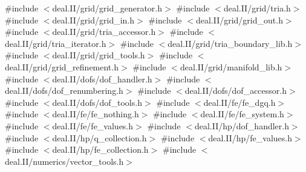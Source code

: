 {\ttfamily \#include $<$deal.\+I\+I/grid/grid\+\_\+generator.\+h$>$}\newline
{\ttfamily \#include $<$deal.\+I\+I/grid/tria.\+h$>$}\newline
{\ttfamily \#include $<$deal.\+I\+I/grid/grid\+\_\+in.\+h$>$}\newline
{\ttfamily \#include $<$deal.\+I\+I/grid/grid\+\_\+out.\+h$>$}\newline
{\ttfamily \#include $<$deal.\+I\+I/grid/tria\+\_\+accessor.\+h$>$}\newline
{\ttfamily \#include $<$deal.\+I\+I/grid/tria\+\_\+iterator.\+h$>$}\newline
{\ttfamily \#include $<$deal.\+I\+I/grid/tria\+\_\+boundary\+\_\+lib.\+h$>$}\newline
{\ttfamily \#include $<$deal.\+I\+I/grid/grid\+\_\+tools.\+h$>$}\newline
{\ttfamily \#include $<$deal.\+I\+I/grid/grid\+\_\+refinement.\+h$>$}\newline
{\ttfamily \#include $<$deal.\+I\+I/grid/manifold\+\_\+lib.\+h$>$}\newline
{\ttfamily \#include $<$deal.\+I\+I/dofs/dof\+\_\+handler.\+h$>$}\newline
{\ttfamily \#include $<$deal.\+I\+I/dofs/dof\+\_\+renumbering.\+h$>$}\newline
{\ttfamily \#include $<$deal.\+I\+I/dofs/dof\+\_\+accessor.\+h$>$}\newline
{\ttfamily \#include $<$deal.\+I\+I/dofs/dof\+\_\+tools.\+h$>$}\newline
{\ttfamily \#include $<$deal.\+I\+I/fe/fe\+\_\+dgq.\+h$>$}\newline
{\ttfamily \#include $<$deal.\+I\+I/fe/fe\+\_\+nothing.\+h$>$}\newline
{\ttfamily \#include $<$deal.\+I\+I/fe/fe\+\_\+system.\+h$>$}\newline
{\ttfamily \#include $<$deal.\+I\+I/fe/fe\+\_\+values.\+h$>$}\newline
{\ttfamily \#include $<$deal.\+I\+I/hp/dof\+\_\+handler.\+h$>$}\newline
{\ttfamily \#include $<$deal.\+I\+I/hp/q\+\_\+collection.\+h$>$}\newline
{\ttfamily \#include $<$deal.\+I\+I/hp/fe\+\_\+values.\+h$>$}\newline
{\ttfamily \#include $<$deal.\+I\+I/hp/fe\+\_\+collection.\+h$>$}\newline
{\ttfamily \#include $<$deal.\+I\+I/numerics/vector\+\_\+tools.\+h$>$}\newline
